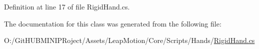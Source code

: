 Definition at line 17 of file Rigid\+Hand.\+cs.



The documentation for this class was generated from the following file\+:\begin{DoxyCompactItemize}
\item 
O\+:/\+Git\+H\+U\+B\+M\+I\+N\+I\+P\+Roject/\+Assets/\+Leap\+Motion/\+Core/\+Scripts/\+Hands/\mbox{\hyperlink{_rigid_hand_8cs}{Rigid\+Hand.\+cs}}\end{DoxyCompactItemize}
